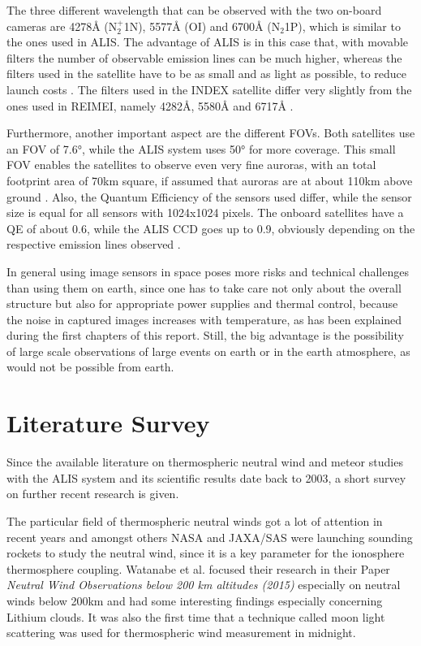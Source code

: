 The three different wavelength that can be observed with the two on-board cameras are 4278Å (N$_2^+$1N), 5577Å (OI) and 6700Å (N$_2$1P), which is similar to the ones used in ALIS. The advantage of ALIS is in this case that, with movable filters the number of observable emission lines can be much higher, whereas the filters used in the satellite have to be as small and as light as possible, to reduce launch costs \citep{obuchi2008initial}.
The filters used in the INDEX satellite differ very slightly from the ones used in REIMEI, namely 4282Å, 5580Å and 6717Å \citep{sakanoi2003development}.

Furthermore, another important aspect are the different FOVs. Both satellites use an FOV of 7.6°, while the ALIS system uses 50° for more coverage. This small FOV enables the satellites to observe even very fine auroras, with an total footprint area of 70km square, if assumed that auroras are at about 110km above ground \citep{obuchi2008initial}.
Also, the Quantum Efficiency of the sensors used differ, while the sensor size is equal for all sensors with 1024x1024 pixels. The onboard satellites have a QE of about 0.6, while the ALIS CCD goes up to 0.9, obviously depending on the respective emission lines observed \citep{obuchi2008initial,brandstrom2003auroral}.

In general using image sensors in space poses more risks and technical challenges than using them on earth, since one has to take care not only about the overall structure but also for appropriate power supplies and thermal control, because the noise in captured images increases with temperature, as has been explained during the first chapters of this report. Still, the big advantage is the possibility of large scale observations of large events on earth or in the earth atmosphere, as would not be possible from earth.

\section{Literature Survey}
Since the available literature on thermospheric neutral wind and meteor studies with the ALIS system and its scientific results date back to 2003, a short survey on further recent research is given.

The particular field of thermospheric neutral winds got a lot of attention in recent years and amongst others NASA and JAXA/SAS were launching sounding rockets to study the neutral wind, since it is a key parameter for the ionosphere thermosphere coupling. Watanabe et al. focused their research in their Paper \textit{Neutral Wind Observations below 200 km altitudes (2015)} especially on neutral winds below 200km and had some interesting findings especially concerning Lithium clouds. It was also the first time that a technique called moon light scattering was used for thermospheric wind measurement in midnight.

